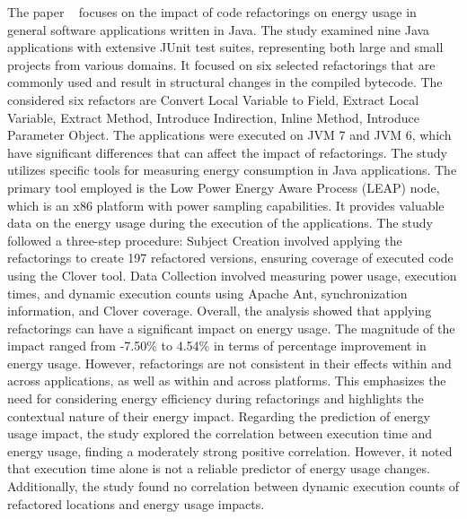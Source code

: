  The paper ~\cite{DBLP:conf/esem/SahinPC14} focuses on the impact of code refactorings on energy usage in general software applications written in Java. The study examined nine Java applications with extensive JUnit test suites, representing both large and small projects from various domains. It focused on six selected refactorings that are commonly used and result in structural changes in the compiled bytecode. The considered six refactors are Convert Local Variable to Field, Extract Local Variable, Extract Method, Introduce Indirection,  Inline Method, Introduce Parameter Object. The applications were executed on JVM 7 and JVM 6, which have significant differences that can affect the impact of refactorings. The study utilizes specific tools for measuring energy consumption in Java applications. The primary tool employed is the Low Power Energy Aware Process (LEAP) node, which is an x86 platform with power sampling capabilities. It provides valuable data on the energy usage during the execution of the applications. The study followed a three-step procedure: Subject Creation involved applying the refactorings to create 197 refactored versions, ensuring coverage of executed code using the Clover tool. Data Collection involved measuring power usage, execution times, and dynamic execution counts using Apache Ant, synchronization information, and Clover coverage. Overall, the analysis showed that applying refactorings can have a significant impact on energy usage. The magnitude of the impact ranged from -7.50\% to 4.54\% in terms of percentage improvement in energy usage. However, refactorings are not consistent in their effects within and across applications, as well as within and across platforms. This emphasizes the need for considering energy efficiency during refactorings and highlights the contextual nature of their energy impact. Regarding the prediction of energy usage impact, the study explored the correlation between execution time and energy usage, finding a moderately strong positive correlation. However, it noted that execution time alone is not a reliable predictor of energy usage changes. Additionally, the study found no correlation between dynamic execution counts of refactored locations and energy usage impacts.
 
